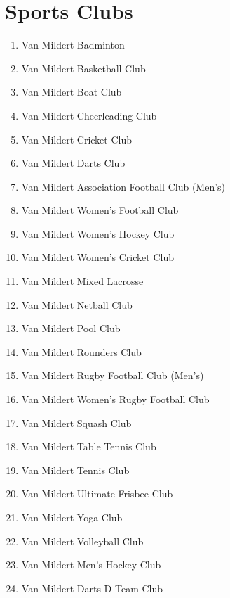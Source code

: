\documentclass[12pt]{article}  %
\begin{document}
\section{Sports Clubs}
\begin{enumerate}[]
    \item Van Mildert Badminton
    \item Van Mildert Basketball Club
    \item Van Mildert Boat Club
    \item Van Mildert Cheerleading Club
    \item Van Mildert Cricket Club
    \item Van Mildert Darts Club
    \item Van Mildert Association Football Club (Men's)
    \item Van Mildert Women's Football Club
    \item Van Mildert Women's Hockey Club
    \item Van Mildert Women’s Cricket Club
    \item Van Mildert Mixed Lacrosse
    \item Van Mildert Netball Club
    \item Van Mildert Pool Club
    \item Van Mildert Rounders Club
    \item Van Mildert Rugby Football Club (Men's)
    \item Van Mildert Women's Rugby Football Club
    \item Van Mildert Squash Club
    \item Van Mildert Table Tennis Club
    \item Van Mildert Tennis Club
    \item Van Mildert Ultimate Frisbee Club
    \item Van Mildert Yoga Club
    \item Van Mildert Volleyball Club
    \item Van Mildert Men's Hockey Club
    \item Van Mildert Darts D-Team Club
\end{enumerate}
\end{document}
